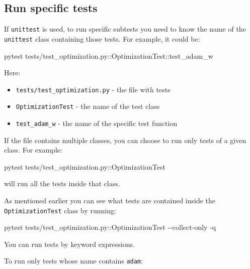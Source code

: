\documentclass[
]{report}
\newenvironment{Shaded}{\begin{snugshade}}{\end{snugshade}}
\newcommand{\AttributeTok}[1]{\textcolor[rgb]{0.40,0.45,0.13}{#1}}
\newcommand{\ExtensionTok}[1]{\textcolor[rgb]{0.00,0.23,0.31}{#1}}
\newcommand{\NormalTok}[1]{\textcolor[rgb]{0.00,0.23,0.31}{#1}}
\providecommand{\tightlist}{%
  \setlength{\itemsep}{0pt}\setlength{\parskip}{0pt}}\usepackage{longtable,booktabs,array}
\begin{document}
\subsection{Run specific tests}\label{run-specific-tests}

If \texttt{unittest} is used, to run specific subtests you need to know
the name of the \texttt{unittest} class containing those tests. For
example, it could be:

\begin{Shaded}
\begin{Highlighting}[]
\ExtensionTok{pytest}\NormalTok{ tests/test\_optimization.py::OptimizationTest::test\_adam\_w}
\end{Highlighting}
\end{Shaded}

Here:

\begin{itemize}
\tightlist
\item
  \texttt{tests/test\_optimization.py} - the file with tests
\item
  \texttt{OptimizationTest} - the name of the test class
\item
  \texttt{test\_adam\_w} - the name of the specific test function
\end{itemize}

If the file contains multiple classes, you can choose to run only tests
of a given class. For example:

\begin{Shaded}
\begin{Highlighting}[]
\ExtensionTok{pytest}\NormalTok{ tests/test\_optimization.py::OptimizationTest}
\end{Highlighting}
\end{Shaded}

will run all the tests inside that class.

As mentioned earlier you can see what tests are contained inside the
\texttt{OptimizationTest} class by running:

\begin{Shaded}
\begin{Highlighting}[]
\ExtensionTok{pytest}\NormalTok{ tests/test\_optimization.py::OptimizationTest }\AttributeTok{{-}{-}collect{-}only} \AttributeTok{{-}q}
\end{Highlighting}
\end{Shaded}

You can run tests by keyword expressions.

To run only tests whose name contains \texttt{adam}:
\end{document}
